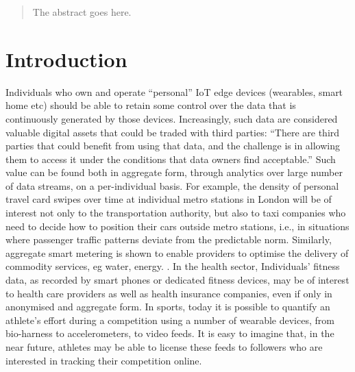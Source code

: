 \documentclass[conference]{IEEEtran}
\begin{document}




\maketitle

\begin{abstract}
The abstract goes here.
\end{abstract}





%
\IEEEpeerreviewmaketitle



\section{Introduction}

Individuals who own and operate “personal” IoT edge devices (wearables, smart home etc) should be able to retain some control over the data that is continuously generated by those devices.
Increasingly, such data are considered valuable digital assets that could be traded with third parties:  “There are third parties that could benefit from using that data, and the challenge is in allowing them to access it under the conditions that data owners find acceptable.” 
Such value can be found both in aggregate form, through analytics over large number of data streams, on a per-individual basis. 
For example, the density of personal travel card swipes over time at individual metro stations in London will be of interest not only to the transportation authority, but also to taxi companies who need to decide how to position their cars outside metro stations, i.e., in situations where passenger traffic patterns deviate from the predictable norm.
 Similarly, aggregate smart metering is shown to enable providers to optimise the delivery of commodity services, eg water, energy.  .
%
In the health sector, Individuals' fitness data, as recorded by smart phones or dedicated fitness devices, may be of interest to health care providers as well as health insurance companies, even if only in anonymised and aggregate form.
%
In sports, today it is possible to quantify an athlete's effort during a competition using a number of wearable devices, from bio-harness to accelerometers, to video feeds. 
It is easy to imagine that, in the near future, athletes may be able to license these feeds to followers who are interested in tracking their competition online.
\end{document}
